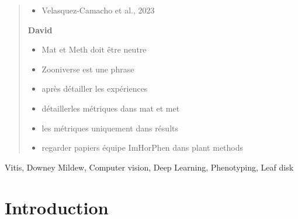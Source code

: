 \documentclass[english]{article}
\begin{document}
\begin{changemargin}{60pt}{60pt}
\begin{abstract}
\begin{itemize}
            	\item Velasquez-Camacho et al., 2023
            \end{itemize}
            \textbf{David}
            \begin{itemize}
                \item Mat et Meth doit être neutre
                \item Zooniverse est une phrase
                \item après détailler les expériences
                \item détaillerles métriques dans mat et met
                \item les métriques uniquement dans résults
                \item regarder papiers équipe ImHorPhen dans plant methods
            \end{itemize}

	\end{abstract}
\end{changemargin}

\begin{keywords}
    Vitis, Downey Mildew, Computer vision, Deep Learning, Phenotyping, Leaf disk
\end{keywords}


\tableofcontents

\section{Introduction}



\end{document}
